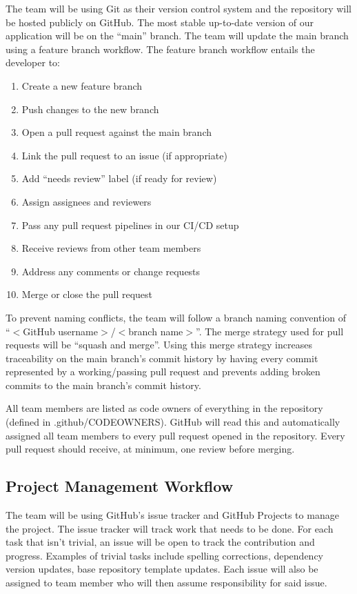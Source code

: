 \documentclass{article}
\begin{document}
The team will be using Git as their version control system and the repository will be hosted
publicly on GitHub. The most stable up-to-date version of our application will be on the ``main''
branch. The team will update the main branch using a feature branch workflow. The feature branch
workflow entails the developer to:

\begin{enumerate}
  \item Create a new feature branch
  \item Push changes to the new branch
  \item Open a pull request against the main branch
  \item Link the pull request to an issue (if appropriate)
  \item Add ``needs review'' label (if ready for review)
  \item Assign assignees and reviewers
  \item Pass any pull request pipelines in our CI/CD setup
  \item Receive reviews from other team members
  \item Address any comments or change requests
  \item Merge or close the pull request
\end{enumerate}

To prevent naming conflicts, the team will follow a branch naming convention of ``$<$GitHub
username$>$/$<$branch name$>$''. The merge strategy used for pull requests will be ``squash and
merge''. Using this merge strategy increases traceability on the main branch's commit history by
having every commit represented by a working/passing pull request and prevents adding broken
commits to the main branch's commit history.

All team members are listed as code owners of everything in the repository (defined in
.github/CODEOWNERS). GitHub will read this and automatically assigned all team members to every
pull request opened in the repository. Every pull request should receive, at minimum, one review
before merging.

\subsection{Project Management Workflow}

The team will be using GitHub's issue tracker and GitHub Projects to manage the project. The issue
tracker will track work that needs to be done. For each task that isn't trivial, an issue will be
open to track the contribution and progress. Examples of trivial tasks include spelling
corrections, dependency version updates, base repository template updates. Each issue will also be
assigned to team member who will then assume responsibility for said issue.
\end{document}
